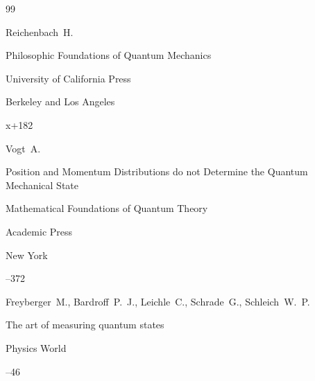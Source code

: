 \begin{thebibliography}{99}















\by  Reichenbach~H.

\book Philosophic Foundations of Quantum Mechanics


\publ University of California Press

\publaddr Berkeley and Los Angeles 

\totalpages x+182




\by Vogt~A.

\paper Position and Momentum Distributions do not Determine the Quantum Mechanical State

\inbook Mathematical Foundations of Quantum Theory


\publ Academic Press

\publaddr New York

--372







\by  Freyberger~M., Bardroff~P.~J., Leichle~C., Schrade~G.,  Schleich~W.~P.

\paper The art of measuring quantum states

 \jour Physics World




--46


\end{thebibliography}
